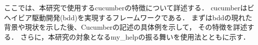 ここでは、本研究で使用するcucumberの特徴について詳述する．
cucumberはビヘイビア駆動開発(bdd)を実現するフレームワークである．
まずはbddの現れた背景や現状を示した後、Cucumberの記述の具体例を示して，
その特徴を詳述する．
さらに，本研究の対象となるmy\_helpの振る舞いを使用法とともに示す．

